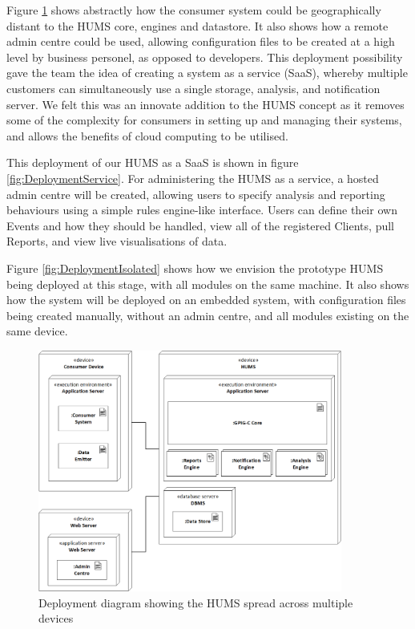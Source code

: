 \documentclass[10pt,a4paper]{article}
\begin{document}
Figure \ref{fig:DeploymentDistributed} shows abstractly how the consumer system could be geographically distant to the HUMS core, engines and datastore. It also shows how a remote admin centre could be used, allowing configuration files to be created at a high level by business personel, as opposed to developers. This deployment possibility gave the team the idea of creating a system as a service (SaaS), whereby multiple customers can simultaneously use a single storage, analysis, and notification server. We felt this was an innovate addition to the HUMS concept as it removes some of the complexity for consumers in setting up and managing their systems, and allows the benefits of cloud computing to be utilised.

This deployment of our HUMS as a SaaS is shown in figure \ref{fig:DeploymentService}. For administering the HUMS as a service, a hosted admin centre will be created, allowing users to specify analysis and reporting behaviours using a simple rules engine-like interface. Users can define their own Events and how they should be handled, view all of the registered Clients, pull Reports, and view live visualisations of data.

Figure \ref{fig:DeploymentIsolated} shows how we envision the prototype HUMS being deployed at this stage, with all modules on the same machine. It also shows how the system will be deployed on an embedded system, with configuration files being created manually, without an admin centre, and all modules existing on the same device.

\begin{figure}[!ht]
  \centering
  \includegraphics[width=10cm]{images/DeploymentDistributed.png}
  \caption{Deployment diagram showing the HUMS spread across multiple 
devices}
  \label{fig:DeploymentDistributed}
\end{figure}
\end{document}
